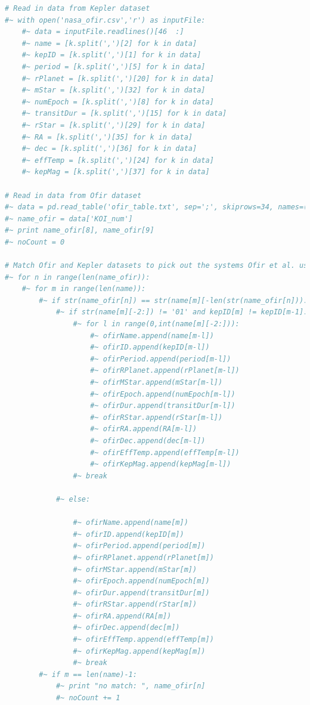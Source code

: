 \documentclass[12pt]{report}
\begin{document}
\begin{appendix}
\begin{lstlisting}[language=Python]
# Read in data from Kepler dataset
#~ with open('nasa_ofir.csv','r') as inputFile: 
	#~ data = inputFile.readlines()[46	:]
	#~ name = [k.split(',')[2] for k in data]
	#~ kepID = [k.split(',')[1] for k in data]
	#~ period = [k.split(',')[5] for k in data]
	#~ rPlanet = [k.split(',')[20] for k in data]
	#~ mStar = [k.split(',')[32] for k in data]
	#~ numEpoch = [k.split(',')[8] for k in data]
	#~ transitDur = [k.split(',')[15] for k in data]
	#~ rStar = [k.split(',')[29] for k in data]
	#~ RA = [k.split(',')[35] for k in data]
	#~ dec = [k.split(',')[36] for k in data]
	#~ effTemp = [k.split(',')[24] for k in data]
	#~ kepMag = [k.split(',')[37] for k in data]
	
# Read in data from Ofir dataset
#~ data = pd.read_table('ofir_table.txt', sep=';', skiprows=34, names=('KOI_num', 'newDetFlag', 'TTVfre', 'TTV+uncer', 'TTV-uncer', 'TTV_per', 'Delta_chi', 'chi_area', 'chi_single', 'chi_RMS', 'cho_correl', 'TTV_amp', 'TTV_amp+_uncer', 'TTV_amp-_uncer', 'TTV_ref', 'TTV_ref+_uncer', 'TTV_ref-_uncer', 'cofid', 'STD_error', '20', '21', '22', '23', '24'))
#~ name_ofir = data['KOI_num']
#~ print name_ofir[8], name_ofir[9]
#~ noCount = 0

# Match Ofir and Kepler datasets to pick out the systems Ofir et al. used in their simulations.
#~ for n in range(len(name_ofir)):
	#~ for m in range(len(name)):
		#~ if str(name_ofir[n]) == str(name[m][-len(str(name_ofir[n])):]):
			#~ if str(name[m][-2:]) != '01' and kepID[m] != kepID[m-1]:
				#~ for l in range(0,int(name[m][-2:])):
					#~ ofirName.append(name[m-l])
					#~ ofirID.append(kepID[m-l])
					#~ ofirPeriod.append(period[m-l])
					#~ ofirRPlanet.append(rPlanet[m-l])
					#~ ofirMStar.append(mStar[m-l])
					#~ ofirEpoch.append(numEpoch[m-l])
					#~ ofirDur.append(transitDur[m-l])
					#~ ofirRStar.append(rStar[m-l])
					#~ ofirRA.append(RA[m-l])
					#~ ofirDec.append(dec[m-l])
					#~ ofirEffTemp.append(effTemp[m-l])
					#~ ofirKepMag.append(kepMag[m-l])
				#~ break
					
			#~ else:

				#~ ofirName.append(name[m])
				#~ ofirID.append(kepID[m])
				#~ ofirPeriod.append(period[m])
				#~ ofirRPlanet.append(rPlanet[m])
				#~ ofirMStar.append(mStar[m])
				#~ ofirEpoch.append(numEpoch[m])
				#~ ofirDur.append(transitDur[m])
				#~ ofirRStar.append(rStar[m])
				#~ ofirRA.append(RA[m])
				#~ ofirDec.append(dec[m])
				#~ ofirEffTemp.append(effTemp[m])
				#~ ofirKepMag.append(kepMag[m])
				#~ break
		#~ if m == len(name)-1:
			#~ print "no match: ", name_ofir[n]
			#~ noCount += 1




\end{lstlisting}
\end{appendix}
\end{document}
